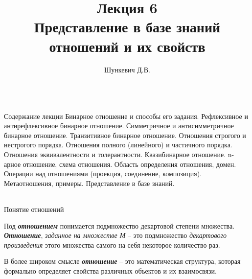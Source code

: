 \title{Лекция 6\\Представление в базе знаний отношений и их свойств}   
\author[]{Шункевич Д.В.}

\begin{frame}
	\titlepage
\end{frame}

\begin{frame}{\\Содержание лекции}
	\topline
	\justifying
	Бинарное отношение и способы его задания. Рефлексивное и антирефлексивное бинарное отношение. Симметричное и антисимметричное бинарное отношение. Транзитивное бинарное отношение. Отношения строгого и нестрогого порядка. Отношения полного (линейного) и частичного порядка. Отношения эквивалентности и толерантности. Квазибинарное отношение. n-арное отношение, схема отношения. Область определения отношения, домен. Операции над отношениями (проекция, соединение, композиция). Метаотношения, примеры. Представление в базе знаний.
\end{frame}

\begin{frame}{\\Понятие отношений}
	\topline
	\justifying
	
	Под \textbf{\textit{отношением}} понимается подмножество декартовой степени множества.\\
	
	\textbf{\textit{Отношение}}, \textit{заданное на множестве М} -- это подмножество \textit{декартового произведения} этого множества самого на себя некоторое количество раз.\\
	
	
	В более широком смысле {\textbf{\textit{отношение}}} -- это математическая структура, которая формально определяет свойства различных объектов и их взаимосвязи.
\end{frame}

